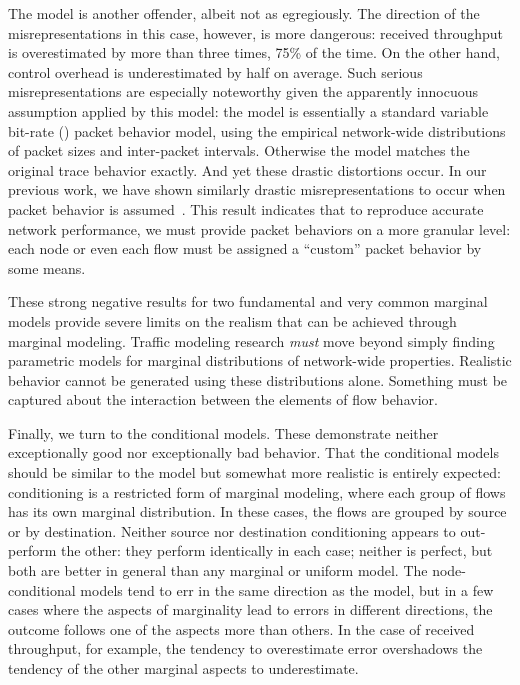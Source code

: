 \documentclass[twocolumn,final]{svjour3}
\begin{document}
The  model is another offender, albeit not as egregiously. The direction of the misrepresentations in this case, however, is more dangerous: received throughput is overestimated by more than three times, 75\% of the time. On the other hand,  control overhead is underestimated by half on average. Such serious misrepresentations are especially noteworthy given the apparently innocuous assumption applied by this model: the  model is essentially a standard variable bit-rate () packet behavior model, using the empirical network-wide distributions of packet sizes and inter-packet intervals. Otherwise the model matches the original trace behavior exactly. And yet these drastic distortions occur. In our previous work, we have shown similarly drastic misrepresentations to occur when  packet behavior is assumed~\cite{Karpinski07:cbr-failure}. This result indicates that to reproduce accurate network performance, we must provide packet behaviors on a more granular level: each node or even each flow must be assigned a ``custom'' packet behavior by some means.

These strong negative results for two fundamental and very common marginal models provide severe limits on the realism that can be achieved through marginal modeling. Traffic modeling research \textit{must} move beyond simply finding parametric models for marginal distributions of network-wide properties. Realistic behavior cannot be generated using these distributions alone. Something must be captured about the interaction between the elements of flow behavior.

Finally, we turn to the conditional models. These demonstrate neither exceptionally good nor exceptionally bad behavior. That the conditional models should be similar to the  model but somewhat more realistic is entirely expected: conditioning is a restricted form of marginal modeling, where each group of flows has its own marginal distribution. In these cases, the flows are grouped by source or by destination.
Neither source nor destination conditioning appears to out-perform the other:
they perform identically in each case;
neither is perfect, but both are better in general than any marginal or uniform model.
The node-conditional models tend to err in the same direction as the  model, but in a few cases where the aspects of marginality lead to errors in different directions, the outcome follows one of the aspects more than others.
In the case of received throughput, for example, the  tendency to overestimate error overshadows the tendency of the other marginal aspects to underestimate.
\end{document}
